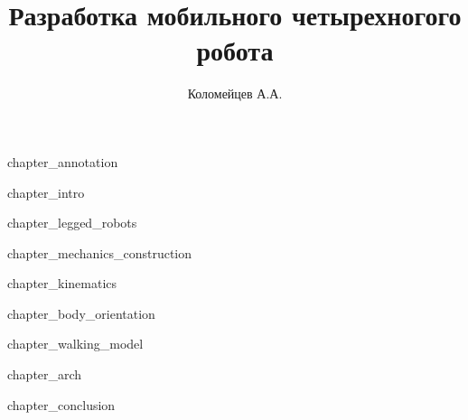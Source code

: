 \documentclass[a4paper,14pt,russian]{extreport}
\author{Коломейцев А.А.}
\title{Разработка мобильного четырехногого робота}
\affil{НИУ "МЭИ"}
\newcommand{\includechapter}[1]{{chapter_#1}\newpage}
\newcommand{\includeappend}[1]{{append_#1}\newpage}
\newcommand{\includebiblio}[1]{
    \begingroup
    \renewcommand{\chapter}[2]{
        \clearpage
        \stepcounter{chapter}
        \centering\paragraph{\MakeUppercase{Библиографический список}}
        \addcontentsline{toc}{likechapter}{\MakeUppercase{Библиографический список}}
    }
    \let\bibfont\protect\normalsize
    
    \endgroup
}
\newcommand{\append}[1]{
    \clearpage
    \stepcounter{chapter}
    \begin{center}
        \paragraph{\MakeUppercase{\chaptertitlename~\Asbuk{chapter}}}
        \vspace{-0.5cm}
        \paragraph{\MakeUppercase{ #1}}
    \end{center}
    \addcontentsline{toc}{likechapter}{\MakeUppercase{\chaptertitlename~\Asbuk{chapter}: #1}}
}
\begin{document}
\maketitle
\newpage

\includechapter{annotation} %

\tableofcontents\newpage

\includechapter{intro} %

\includechapter{legged_robots}

\includechapter{mechanics_construction}

\includechapter{kinematics}

\includechapter{body_orientation}

\includechapter{walking_model}

\includechapter{arch}

\includechapter{conclusion}


\includebiblio{sources} %


\appendix


% 
\end{document}
